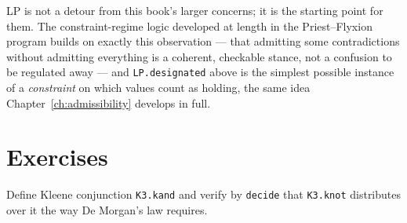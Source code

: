 LP is not a detour from this book's larger concerns; it is the
starting point for them. The constraint-regime logic developed at
length in the Priest–Flyxion program builds on exactly this
observation — that admitting some contradictions without admitting
everything is a coherent, checkable stance, not a confusion to be
regulated away — and \texttt{LP.designated} above is the simplest
possible instance of a \emph{constraint} on which values count as
holding, the same idea Chapter~\ref{ch:admissibility} develops in
full.

\section{Exercises}

\begin{exercise}
Define Kleene conjunction \texttt{K3.kand} and verify by
\texttt{decide} that \texttt{K3.knot} distributes over it the way De
Morgan's law requires.
\end{exercise}
